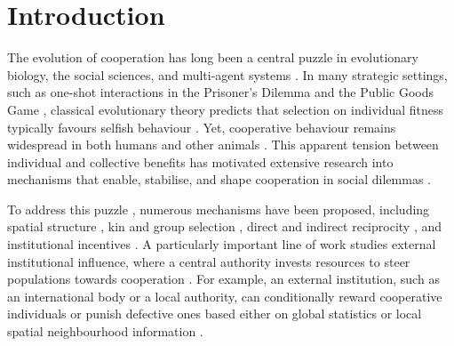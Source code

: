 \documentclass{article}
\begin{document}
\begin{abstract}
Overall, our results reveal a systematic gap between incentives optimised for cost or cooperation frequency and those that maximise welfare. %

\end{abstract}
\tableofcontents



\section{Introduction}
The evolution of cooperation has long been a central puzzle in evolutionary biology, the social sciences, and multi-agent systems \cite{sigmund2010calculus,han2022emergent,paiva2018engineering,tuyls2007evolutionary,perc2017statistical}. In many strategic settings, such as one-shot interactions in the Prisoner’s Dilemma and the Public Goods Game \cite{archetti2012game,axelrod1981evolution,doebeli2005models}, classical evolutionary theory predicts that selection on individual fitness typically favours selfish behaviour \cite{sigmund2010calculus,hofbauer1998evolutionary}. Yet, cooperative behaviour remains widespread in both humans and other animals \cite{fehr2004social,nowak2006five}. This apparent tension between individual and collective benefits has motivated extensive research into mechanisms that enable, stabilise, and shape cooperation in social dilemmas \cite{perc2017statistical,HAN2026_social_welfare,szabo2007evolutionary,xia2023reputation,liu2026dynamic}.

To address this puzzle \cite{perc2017statistical,rand2011evolution}, numerous mechanisms have been proposed, including spatial structure \cite{szabo2007evolutionary,szolnoki2011phase}, kin and group selection \cite{hamilton1964genetical,traulsen2006evolution}, direct and indirect reciprocity \cite{nowak:2005:nature,xia2023reputation}, and institutional incentives \cite{fehr2000cooperation,sasaki2012take,chen2015first,sun2023state}. A particularly important line of work studies external institutional influence, where a central authority invests resources to steer populations towards cooperation \cite{chen2015first,duong2023cost,sigmund2001reward}. For example, an external institution, such as an international body or a local authority, can conditionally reward cooperative individuals or punish defective ones  based either on global statistics  or  local spatial neighbourhood information  \cite{cimpeanu2021cost,han2018fostering,wang2019exploring,sigmund2010social,brandt2006punishing,wang2021incentive,sun2023state}. 
\end{document}
